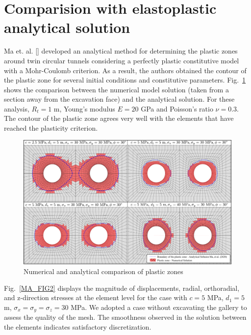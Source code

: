 \documentclass[a4paper,fleqn]{cas-sc}
\begin{document}
\section{Comparision with elastoplastic analytical solution}\label{}

Ma et. al. [] developed an analytical method for determining the plastic zones around twin circular tunnels considering a perfectly plastic constitutive model with a Mohr-Coulomb criterion. As a result, the authors obtained the contour of the plastic zone for several initial conditions and constitutive parameters. Fig.~\ref{MA_FIG1} shows the comparison between the numerical model solution (taken from a section away from the excavation face) and the analytical solution. For these analysis, $R_t = 1$ m, Young's modulus $E=20$ GPa and Poisson's ratio $\nu = 0.3$. The contour of the plastic zone agrees very well with the elements that have reached the plasticity criterion.

\begin{figure}[h!]
	\centering
	\includegraphics[scale=0.7]{MA_FIG1.pdf}
	\caption{Numerical and analytical comparison of plastic zones}
	\label{MA_FIG1}
\end{figure}
\FloatBarrier

Fig.~\ref{MA_FIG2} displays the magnitude of displacements, radial, orthoradial, and z-direction stresses at the element level  for the case with $c=5$ MPa, $d_1=5$ m, $\sigma_x = \sigma_y = \sigma_z = 30$ MPa. We adopted a case without excavating the gallery to assess the quality of the mesh. The smoothness observed in the solution between the elements indicates satisfactory discretization.
\end{document}
